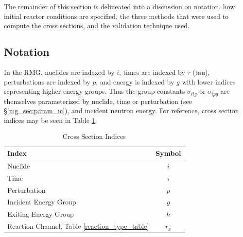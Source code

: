 The remainder of this section is delineated into a discussion on notation, how initial 
reactor conditions are specified, the three methods that were used to compute the
cross sections, and the validation technique used.





\subsection{Notation}
\label{mg_sec:notation}
In the RMG, nuclides are indexed by $i$, times are indexed by $\tau$ (tau), perturbations are indexed by $p$, 
and energy is indexed by $g$ with lower indices representing higher energy groups.
Thus the group constants $\sigma_{itg}$ or $\sigma_{ipg}$ are themselves parameterized by nuclide, 
time or perturbation (see \S \ref{mg_sec:param_ic}), and incident neutron energy.  
For reference, cross section indices may be seen in Table \ref{rmg_xs_ind}.

\begin{table}[htbp]
\begin{center}
\caption{Cross Section Indices}
\label{rmg_xs_ind}
\begin{tabular}{|l|c|}
\hline
\textbf{Index}        & \textbf{Symbol} \\
\hline
Nuclide               & $i$ \\
Time                  & $\tau$ \\
Perturbation          & $p$ \\
Incident Energy Group & $g$ \\
Exiting Energy Group  & $h$ \\
Reaction Channel, Table \ref{reaction_type_table} & $r_x$ \\
\hline
\end{tabular}
\end{center}
\end{table}


